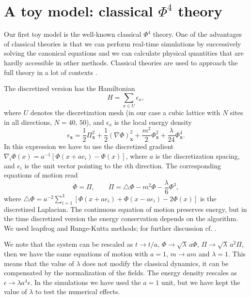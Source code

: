 \documentclass[aps,prd,twocolumn,showpacs,superscriptaddress,groupedaddress]{revtex4}  %
\begin{document}
\section{A toy model: classical $\Phi^4$ theory}

Our first toy model is the well-known classical $\Phi^4$ theory.  One
of the advantages of classical theories is that we can perform
real-time simulations by successively solving the canonical equations
and we can calculate physical quantities that are hardly accessible in
other methods. Classical theories are used to approach the full theory
in a lot of contexts 
\cite{Aarts:2000mg,
Borsanyi:2003ib,
Destri:2004ck,
Sexty:2005pz,
Romatschke:2006nk,
Berges:2011sb,
Jin:2012qh,
Berges:2014yta,
Berges:2015ixa,
Homor:2015qza}.

The discretized version has the Hamiltonian \cite{Homor:2015qza}
\begin{equation}
  H = \sum_{x\in U} \epsilon_x,
\end{equation}
where $U$ denotes the discretization mesh (in our case a cubic lattice
with $N$ sites in all directions, $N=40,\,50$), and $\epsilon_x$ is the
local energy density
\begin{equation}
\epsilon_\mathbf{x}=\frac{1}{2}\Pi_{\mathbf{x}}^2 + \frac{1}{2}(\nabla
\Phi)_{\mathbf{x}}^2 + \frac{m^2}{2}\Phi_{\mathbf{x}}^2 +
\frac{\lambda}{24}\Phi_{\mathbf{x}}^4. 
\end{equation}
In this expression we have to use the discretized gradient
$\nabla_i\Phi(x) = a^{-1}[\Phi(x+a e_i)-\Phi(x)]$, where $a$ is the
discretization spacing, and $e_i$ is the unit vector pointing to the
$i$th direction. The corresponding equations of motion read
\begin{equation}
  \dot \Phi =\Pi,\qquad \dot\Pi=\triangle\Phi -
  m^2\Phi-\frac\lambda6\Phi^3, 
\end{equation}
where
$\triangle\Phi=a^{-2}\sum_{i=1}^3[\Phi(x+ae_i)+\Phi(x-ae_i)-2\Phi(x)]$
is the discretized Laplacian. The continuous equation of motion
preserves energy, but in the time discretized version the energy
conservation depends on the algorithm. We used leapfrog and
Runge-Kutta methods; for further discussion cf. \cite{Homor:2015qza}.

We note that the system can be rescaled as
$t\to t/a,\, \Phi\to \sqrt{\lambda}\,a\Phi,\, \Pi\to
\sqrt{\lambda}\,a^2\Pi$,
then we have the same equations of motion with $a=1$, $ m\to am$ and
$\lambda=1$. This means that the value of $\lambda$ does not modify
the classical dynamics, it can be compensated by the normalization of
the fields. The energy density rescales as
$\epsilon\to \lambda a^4 \epsilon$.  In the simulations we have used
the $a=1$ unit, but we have kept the value of $\lambda$ to test the
numerical effects.
\end{document}
